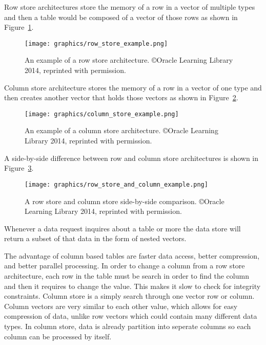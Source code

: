\documentclass[letterpaper, 12pt]{article}
\begin{document}
Row store architectures store the memory of a row in a vector of multiple types and then
a table would be composed of a vector of those rows as shown in Figure~\ref{fig:row_store_ex}.
\begin{figure}[H]
  \centering
  \texttt{[image: graphics/row\_store\_example.png]}
  \caption{An example of a row store architecture. \copyright Oracle Learning Library 2014, reprinted with permission.\cite{rowstore}}
  \label{fig:row_store_ex}
\end{figure}

Column store architecture stores the memory of a row in a vector of one type and then 
creates another vector that holds those vectors as shown in Figure~\ref{fig:column_store_ex}.
\par\vspace{\baselineskip}

\begin{figure}
  \centering
  \texttt{[image: graphics/column\_store\_example.png]}
  \caption{An example of a column store architecture. \copyright Oracle Learning Library 2014, reprinted with permission.\cite{rowstore}}
  \label{fig:column_store_ex}
\end{figure}

A side-by-side difference between row and column store architectures is shown in Figure~\ref{fig:row_column_diff}.
\par\vspace{\baselineskip}

\begin{figure}
  \centering
  \texttt{[image: graphics/row\_store\_and\_column\_example.png]}
  \caption{A row store and column store side-by-side comparison. \copyright Oracle Learning Library 2014, reprinted with permission.\cite{rowstore}}
  \label{fig:row_column_diff}
\end{figure}

Whenever a data request inquires about a table or more the data store will return a subset of that
data in the form of nested vectors.
\par\vspace{\baselineskip}

The advantage of column based tables are faster data access, better compression, and better parallel processing.
In order to change a column from a row store architecture, each row in the table must be search in order to find the
column and then it requires to change the value. This makes it slow to check for integrity constraints. Column store
is a simply search through one vector row or column. Column vectors are very similar to each other value, which allows
for easy compression of data, unlike row vectors which could contain many different data types. In column store, data
is already partition into seperate columns so each column can be processed by itself.
\par\vspace{\baselineskip}
\end{document}
